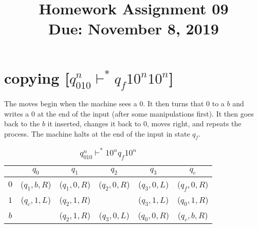 \documentclass[11pt,letterpaper]{article}
\title{Homework Assignment 09 \\
    \small Due: November 8, 2019}
\begin{document}
\maketitle

\section{copying [$q_010^n \vdash^* q_f10^n10^n$]}
The moves begin when the machine sees a $0$. It then turns that $0$ to a $b$ and writes a $0$ at the end of the input (after some manipulations first). It then goes back to the $b$ it inserted, changes it back to $0$, moves right, and repeats the process. The machine halts at the end of the input in state $q_f$.
\begin{table}[ht]
    \label{tab:copy}
    \centering
    \begin{tabular}{c | c c c c c}
         & $q_0$ & $q_1$ & $q_2$ & 
         $q_3$ & $q_c$ \\
         \hline
         $0$ & ($q_1,b,R$) & ($q_1,0,R$) & ($q_2,0,R$) & ($q_3,0,L$) & ($q_f,0,R$) \\
         $1$ & ($q_c,1,L$) & ($q_2,1,R$) & & ($q_3,1,L$) & ($q_0,1,R$) \\
         $b$ & & ($q_2,1,R$) & ($q_3,0,L$) & ($q_0,0,R$) & ($q_c,b,R$) \\
    \end{tabular}
    \caption{$q_010^n \vdash^* 10^nq_f10^n$}
\end{table}
\end{document}
